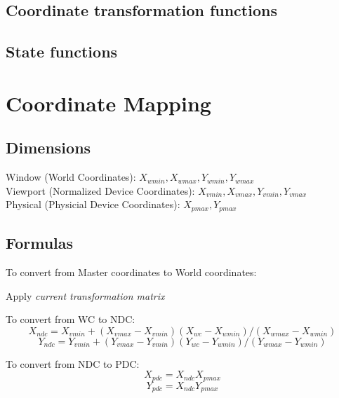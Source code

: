 \subsection{Coordinate transformation functions}%
\begin{twocollist}
\end{twocollist}

\subsection{State functions}
\begin{twocollist}
\end{twocollist}

\section{Coordinate Mapping}

\subsection{Dimensions}
Window (World Coordinates):  $X_{wmin}, X_{wmax}, Y_{wmin}, Y_{wmax}$ \\
Viewport (Normalized Device Coordinates): $X_{vmin}, X_{vmax}, Y_{vmin}, Y_{vmax}$\\
Physical (Physicial Device Coordinates): $X_{pmax}, Y_{pmax}$\\

\subsection{Formulas}
To convert from Master coordinates to World coordinates: \\
\centerline{Apply \emph{current transformation matrix}}

To convert from WC to NDC:\\
\begin{equation}
X_{ndc} = X_{vmin} + (X_{vmax} - X_{vmin})  (X_{wc} - X_{wmin}) / (X_{wmax} - X_{wmin})
\end{equation}
\begin{equation}
Y_{ndc} = Y_{vmin} + (Y_{vmax} - Y_{vmin}) (Y_{wc} - Y_{wmin}) / (Y_{wmax} - Y_{wmin})
\end{equation}

To convert from NDC to PDC:
\begin{equation}
     X_{pdc} = X_{ndc} X_{pmax}
\end{equation}
\begin{equation}
     Y_{pdc} = X_{ndc} Y_{pmax}
\end{equation}
